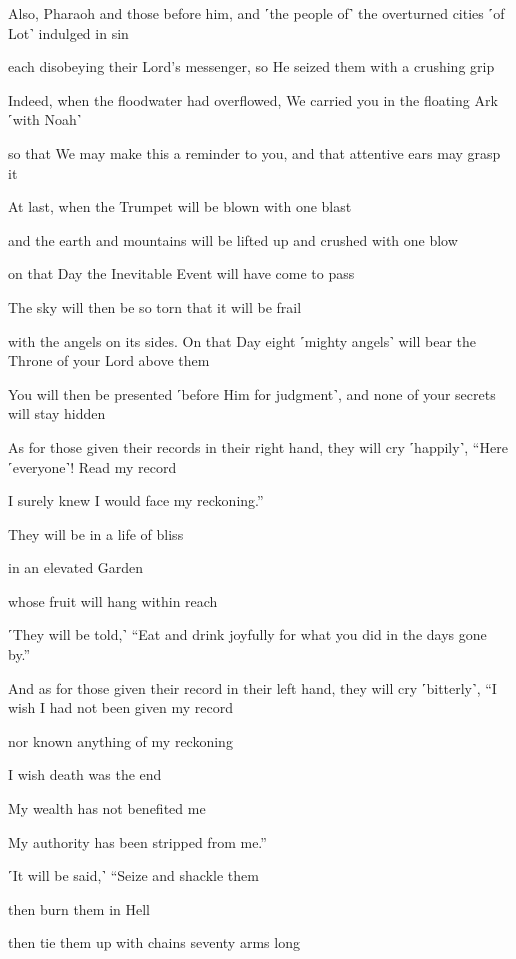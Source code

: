 Also, Pharaoh and those before him, and ˹the people of˺ the overturned cities ˹of Lot˺ indulged in sin

each disobeying their Lord’s messenger, so He seized them with a crushing grip

Indeed, when the floodwater had overflowed, We carried you in the floating Ark ˹with Noah˺

so that We may make this a reminder to you, and that attentive ears may grasp it

At last, when the Trumpet will be blown with one blast

and the earth and mountains will be lifted up and crushed with one blow

on that Day the Inevitable Event will have come to pass

The sky will then be so torn that it will be frail

with the angels on its sides. On that Day eight ˹mighty angels˺ will bear the Throne of your Lord above them

You will then be presented ˹before Him for judgment˺, and none of your secrets will stay hidden

As for those given their records in their right hand, they will cry ˹happily˺, “Here ˹everyone˺! Read my record

I surely knew I would face my reckoning.”

They will be in a life of bliss

in an elevated Garden

whose fruit will hang within reach

˹They will be told,˺ “Eat and drink joyfully for what you did in the days gone by.”

And as for those given their record in their left hand, they will cry ˹bitterly˺, “I wish I had not been given my record

nor known anything of my reckoning

I wish death was the end

My wealth has not benefited me

My authority has been stripped from me.”

˹It will be said,˺ “Seize and shackle them

then burn them in Hell

then tie them up with chains seventy arms long

